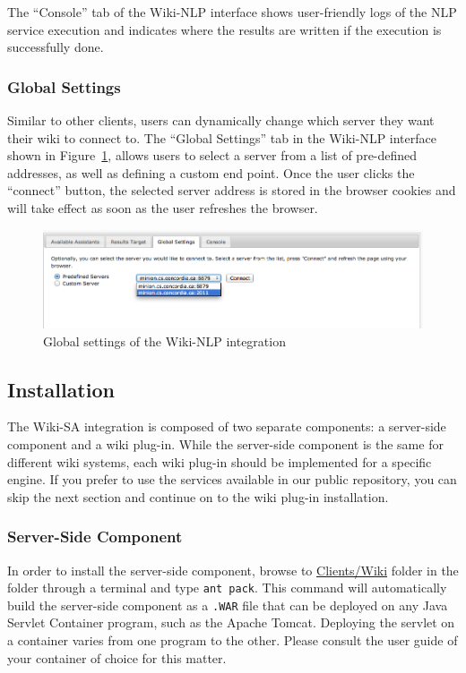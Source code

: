 The ``Console'' tab of the Wiki-NLP interface shows user-friendly logs of the NLP service execution and indicates where the results are written if the execution is successfully done.

\subsubsection{Global Settings}
Similar to other \sa clients, users can dynamically change which \sa server they want their wiki to connect to. The ``Global Settings'' tab in the Wiki-NLP interface shown in Figure~\ref{fig:semassist_settings}, allows users to select a \sa server from a list of pre-defined addresses, as well as defining a custom end point. Once the user clicks the ``connect'' button, the selected server address is stored in the browser cookies and will take effect as soon as the user refreshes the browser.

\begin{figure}[h!]
\centering
\includegraphics[width=\textwidth]{pictures/semassist_settings.png}
\caption{Global settings of the Wiki-NLP integration}
\label{fig:semassist_settings}
\end{figure}

\subsection{Installation}
The Wiki-SA integration is composed of two separate components: a server-side component and a wiki plug-in. While the server-side component is the same for different wiki systems, each wiki plug-in should be implemented for a specific engine. If you prefer to use the services available in our public repository, you can skip the next section and continue on to the wiki plug-in installation.

\subsubsection{Server-Side Component}
\label{sec:wiki_component}
In order to install the server-side component, browse to \url{Clients/Wiki} folder in the \sa folder through a terminal and type \texttt{ant pack}. This command will automatically build the server-side component as a \texttt{.WAR} file that can be deployed on any Java Servlet Container program, such as the Apache Tomcat. Deploying the servlet on a container varies from one program to the other. Please consult the user guide of your container of choice for this matter.

